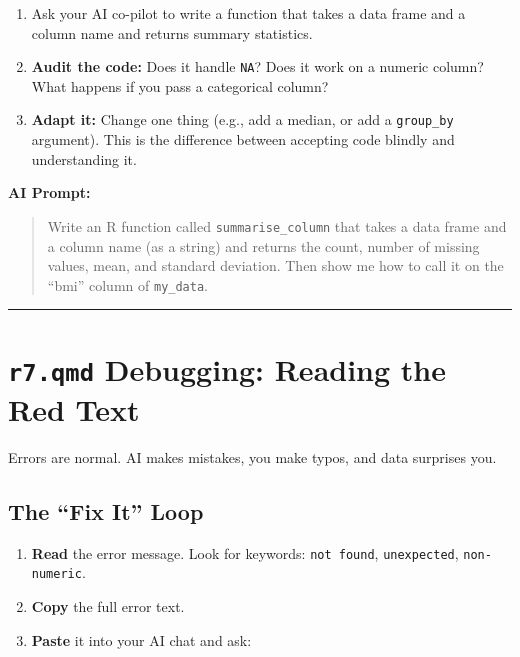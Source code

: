 \documentclass[
  letterpaper,
  DIV=11,
  numbers=noendperiod,
  oneside]{scrreprt}
\providecommand{\tightlist}{%
  \setlength{\itemsep}{0pt}\setlength{\parskip}{0pt}}
\begin{document}
\begin{enumerate}
\def\labelenumi{\arabic{enumi}.}
\tightlist
\item
  Ask your AI co-pilot to write a function that takes a data frame and a
  column name and returns summary statistics.
\item
  \textbf{Audit the code:} Does it handle \texttt{NA}? Does it work on a
  numeric column? What happens if you pass a categorical column?
\item
  \textbf{Adapt it:} Change one thing (e.g., add a median, or add a
  \texttt{group\_by} argument). This is the difference between accepting
  code blindly and understanding it.
\end{enumerate}

\textbf{AI Prompt:}

\begin{quote}
Write an R function called \texttt{summarise\_column} that takes a data
frame and a column name (as a string) and returns the count, number of
missing values, mean, and standard deviation. Then show me how to call
it on the ``bmi'' column of \texttt{my\_data}.
\end{quote}

\begin{center}\rule{0.5\linewidth}{0.5pt}\end{center}

\section*{\texorpdfstring{\texttt{r7.qmd} Debugging: Reading the Red
Text}{r7.qmd Debugging: Reading the Red Text}}\label{r7.qmd-debugging-reading-the-red-text}


Errors are normal. AI makes mistakes, you make typos, and data surprises
you.

\subsection*{The ``Fix It'' Loop}\label{the-fix-it-loop}

\begin{enumerate}
\def\labelenumi{\arabic{enumi}.}
\tightlist
\item
  \textbf{Read} the error message. Look for keywords:
  \texttt{not\ found}, \texttt{unexpected}, \texttt{non-numeric}.
\item
  \textbf{Copy} the full error text.
\item
  \textbf{Paste} it into your AI chat and ask:
\end{enumerate}
\end{document}
